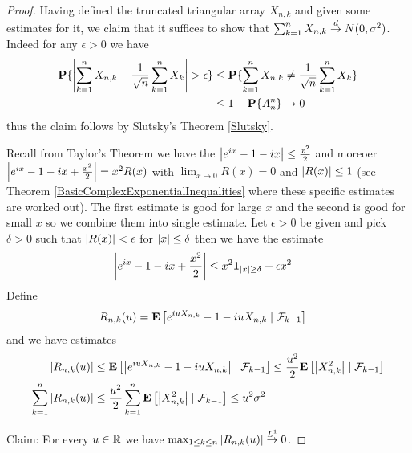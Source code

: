 \begin{proof}
Having defined the truncated triangular array $X_{n,k}$ and given some
estimates for it, we claim that it suffices to show that $\sum_{k=1}^n
X_{n,k} \todist N(0, \sigma^2)$.  Indeed for any $\epsilon > 0$ we have
\begin{align*}
\probability{\abs{\sum_{k=1}^n X_{n,k} - \frac{1}{\sqrt{n}}
  \sum_{k=1}^n X_k} > \epsilon}
&\leq \probability{\sum_{k=1}^n X_{n,k} \neq \frac{1}{\sqrt{n}}
  \sum_{k=1}^n X_k} \\
&\leq 1 - \probability{A^n_n}  \to 0
\end{align*}
thus the claim follows by Slutsky's Theorem \ref{Slutsky}.


Recall from Taylor's Theorem we have the $\abs{e^{ix} -1 -ix} \leq
\frac{x^2}{2}$ and moreoer $\abs{e^{ix} -1 -ix + \frac{x^2}{2}} =
x^2R(x)$ with $\lim_{x \to 0} R(x) = 0$ and $\abs{R(x)} \leq 1$ (see
Theorem \ref{BasicComplexExponentialInequalities} where these specific
estimates are worked out).  The first estimate is good for large $x$
and the second is good for small $x$ so we combine them into single
estimate.
Let $\epsilon > 0$ be given and pick
$\delta > 0$ such that $\abs{R(x)} < \epsilon$ for $\abs{x} \leq
\delta$ then we have the estimate
\begin{align*}
\abs{e^{ix} -1 -ix + \frac{x^2}{2}} &\leq
x^2 \characteristic{\abs{x} \geq \delta} + \epsilon x^2
\end{align*}
Define 
\begin{align*}
R_{n,k}(u) &= 
\cexpectationlong{\mathcal{F}_{k-1}}{e^{iuX_{n,k}} -1-iuX_{n,k}}
\end{align*}
and we have estimates
\begin{align*}
\abs{R_{n,k}(u)}
&\leq \cexpectationlong{\mathcal{F}_{k-1}}{\abs{e^{iuX_{n,k}} -1-iuX_{n,k}}}
\leq \frac{u^2}{2} \cexpectationlong{\mathcal{F}_{k-1}}{\abs{X^2_{n,k}} }\\
\sum_{k=1}^n \abs{R_{n,k}(u)} 
&\leq
\frac{u^2}{2} \sum_{k=1}^n \cexpectationlong{\mathcal{F}_{k-1}}{\abs{X^2_{n,k}} }
\leq u^2 \sigma^2 \\
\end{align*}

Claim: For every $u \in \reals$ we have $\max_{1 \leq k \leq n} \abs{R_{n,k}(u)} \tolp{1} 0$.


\end{proof}
